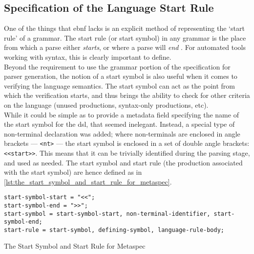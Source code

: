 
\subsection{Specification of the Language Start Rule} %
\label{sub:specification_of_the_language_start_rule}
One of the things that \gls{ebnf} lacks is an explicit method of representing the `start rule' of a grammar. 
The start rule (or start symbol) in any grammar is the place from which a parse either \textit{starts}, or where a parse will \textit{end} \cite{slonneger1995formal}.
For automated tools working with syntax, this is clearly important to define. \\

Beyond the requirement to use the grammar portion of the specification for parser generation, the notion of a start symbol is also useful when it comes to verifying the language semantics.
The start symbol can act as the point from which the verification starts, and thus brings the ability to check for other criteria on the language (unused productions, syntax-only productions, etc). \\

While it could be simple as to provide a metadata field specifying the name of the start symbol for the \gls{dsl}, that seemed inelegant. 
Instead, a special type of non-terminal declaration was added; where non-terminals are enclosed in angle brackets --- \texttt{<nt>} --- the start symbol is enclosed in a set of double angle brackets: \texttt{<<start>>}. 
This means that it can be trivially identified during the parsing stage, and used as needed. 
The start symbol and start rule (the production associated with the start symbol) are hence defined as in \autoref{lst:the_start_symbol_and_start_rule_for_metaspec}.

\begin{listing}[!htb]
\begin{verbatim}
start-symbol-start = "<<";
start-symbol-end = ">>";
start-symbol = start-symbol-start, non-terminal-identifier, start-symbol-end;
start-rule = start-symbol, defining-symbol, language-rule-body;
\end{verbatim}
\caption{The Start Symbol and Start Rule for Metaspec}
\label{lst:the_start_symbol_and_start_rule_for_metaspec}
\end{listing}


